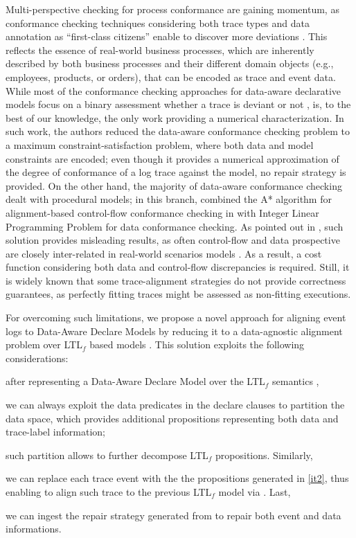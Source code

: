 Multi-perspective checking for process conformance are gaining momentum, as conformance checking techniques considering both trace types and data annotation as ``first-class citizens'' enable to discover more deviations \cite{MultiPerspective}. This reflects the essence of real-world business processes, which are inherently described by both business processes and their different domain objects \cite{PetermannJMR14} (e.g., employees, products, or orders), that can be encoded as trace and event data. While most of the conformance checking approaches for data-aware declarative models focus on a binary assessment whether a trace is deviant or not \cite{BurattinMS16}, \cite{Borrego014} is, to the best of our knowledge, the only work providing a numerical characterization. In such work, the authors reduced the data-aware conformance checking problem to a maximum constraint-satisfaction problem, where both data and model constraints are encoded; even though it provides a numerical approximation of the degree of conformance of a log trace against the model, no repair strategy is provided. On the other hand, the majority of  data-aware conformance checking dealt with procedural models; in this branch, \cite{LeoniA13} combined the A* algorithm for alignment-based control-flow conformance checking in \cite{LeoniMA12} with Integer Linear Programming Problem for data conformance checking. As pointed out in \cite{MultiPerspective}, such solution provides misleading results, as often control-flow and data prospective are closely inter-related in real-world scenarios models \cite{PetermannJMR14}. As a result, a cost function considering both data and control-flow discrepancies is required. Still, it is widely known \cite{AdriansyahDA10} that some trace-alignment strategies do not provide correctness guarantees, as perfectly fitting traces might be assessed as non-fitting executions. 

For overcoming such limitations, we propose a novel approach for aligning event logs to Data-Aware Declare Models by reducing it to a data-agnostic alignment problem over LTL$_f$ based models \cite{XuLZ17a}. This solution exploits the following considerations: \begin{enumerate*}[label=\emph{\alph*})]
	\item after representing a Data-Aware Declare Model over the LTL$_f$ semantics \cite{10.1007/978-3-642-40176-3_8}, 
	\item \label{it2} we can always exploit the data predicates in the declare clauses to partition the data space, which provides additional propositions representing both data and trace-label information;
	\item such partition allows to further decompose  LTL$_f$ propositions. Similarly,
	\item we can replace each trace event with the the propositions generated in \ref{it2}, thus enabling to align such trace to the previous LTL$_f$ model via \cite{XuLZ17a}. Last,
	\item we can ingest the repair strategy generated from \cite{XuLZ17a} to repair both event and data informations.
\end{enumerate*}

